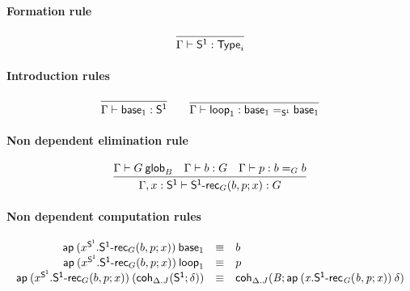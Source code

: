 \paragraph{Formation rule}

\begin{small}
  \[
  \infer{\wftype\Gamma{\dsd{S^1}}}{}
  \]
\end{small}

\paragraph{Introduction rules}

\begin{small}
  \[
  \infer{\ofglob{\Gamma}{\base{1}}{\dsd{S^1}}}{} \qquad
  \infer{\ofglob{\Gamma}{\lp{1}}{\homj{\dsd{S^1}}{\base{1}}{\base{1}}}}{}
  \]
\end{small}

\paragraph{Non dependent elimination rule}

\begin{small}
  \[
  \infer{\ofglob{\Gamma,x:\dsd{S^1}}{\dsd{S^1\text{-}rec}_G(b, p; x)}{G}}
  {\wfglob{\Gamma}{G}{B} & \ofglob{\Gamma}{b}{G} &
    \ofglob{\Gamma}{p}{\homj{G}{b}{b}}}
  \]
\end{small}


\paragraph{Non dependent computation rules}

\begin{small}
  \[
  \begin{array}{rcl}
    \mathsf{ap} \: {(x^{\mathsf{S^1}}.\mathsf{S^1\text{-}rec}_G(b, p; x))} \: {\mathsf{base}_{1}} &
    \equiv & b \\
    \mathsf{ap} \: {(x^{\mathsf{S^1}}.\mathsf{S^1\text{-}rec}_G(b, p; x))} \: {\mathsf{loop}_{1}} & \equiv & p\\
    \mathsf{ap} \: {(x^{\mathsf{S^1}}.\mathsf{S^1\text{-}rec}_G(b, p; x))} \: {(\mathsf{coh}_{\Delta.J} \mathit{(\mathsf{S^1};\delta)})} & \equiv &
    \mathsf{coh}_{\Delta.J} \mathit{(B;\mathsf{ap} \: {(x.\mathsf{S^1\text{-}rec}_G(b, p; x))} \: {\delta})}
    \\
  \end{array}
  \]
\end{small}

